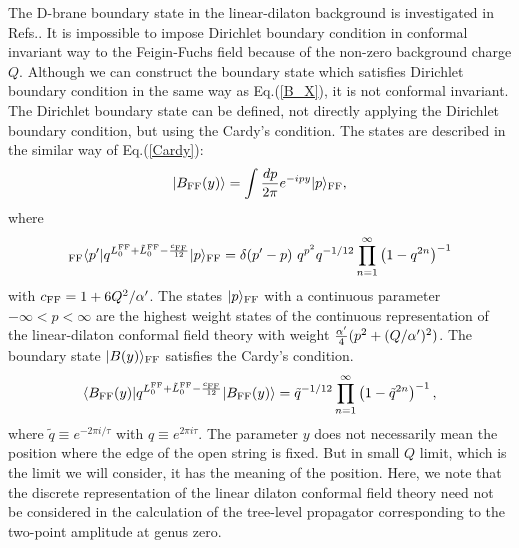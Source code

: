\documentclass[a4paper,prd,preprint]{revtex4}
\begin{document}
The D-brane boundary state in the linear-dilaton background
 is investigated in Refs.\cite{Li,Rajaraman-Rozali}.
It is impossible to impose Dirichlet boundary condition
 in conformal invariant way to the Feigin-Fuchs field
 because of the non-zero background charge $Q$\cite{Li}.
Although we can construct the boundary state
 which satisfies Dirichlet boundary condition
 in the same way as Eq.(\ref{B_X}),
 it is not conformal invariant.
The Dirichlet boundary state can be defined,
 not directly applying the Dirichlet boundary condition,
 but using the Cardy's condition\cite{Rajaraman-Rozali}.
The states are described in the similar way of Eq.(\ref{Cardy}):
\begin{equation}
 | B_{\rm FF}(y) \rangle
 = \int {{dp} \over {2\pi}} e^{-i p y} | p \rangle_{\rm FF},
\label{B_FF}
\end{equation}
 where
\begin{equation}
 {}_{\rm FF}\langle p' |
  q^{L_0^{\rm FF} + {\tilde L}_0^{\rm FF} - {c_{\rm FF} \over {12}}}
 | p \rangle_{\rm FF}
 = \delta (p'-p) \ q^{p^2} q^{-1/12}
   \prod_{n=1}^\infty \left( 1 - q^{2n} \right)^{-1}
\end{equation}
 with $c_{\rm FF} = 1 + 6 Q^2 / \alpha'$.
The states $| p \rangle_{\rm FF}$
 with a continuous parameter $-\infty < p < \infty$
 are the highest weight states of the continuous representation
 of the linear-dilaton conformal field theory
 with weight
 ${{\alpha'} \over 4} ( p^2 + ( Q/\alpha')^2 )$.
The boundary state $| B(y) \rangle_{\rm FF}$ satisfies
 the Cardy's condition.
\begin{equation}
 \langle B_{\rm FF}(y) |
  q^{L_0^{\rm FF} + {\tilde L}_0^{\rm FF} - {c_{\rm FF} \over {12}}}
 | B_{\rm FF}(y) \rangle
 = {\tilde q}^{-1/12}
   \prod_{n=1}^\infty \left( 1 - {\tilde q}^{2n} \right)^{-1},
\end{equation}
 where ${\tilde q} \equiv e^{-2 \pi i / \tau}$
 with $q \equiv e^{2 \pi i \tau}$.
The parameter $y$ does not necessarily mean the position
 where the edge of the open string is fixed.
But in small $Q$ limit,
 which is the limit we will consider,
 it has the meaning of the position.
Here, we note that the discrete representation of
 the linear dilaton conformal field theory need not be considered
 in the calculation of the tree-level propagator
 corresponding to the two-point amplitude at genus zero\cite{AFK}.
\end{document}
